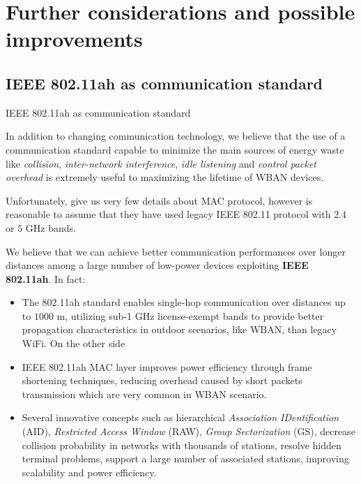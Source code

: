 \documentclass[10pt]{beamer}
\begin{document}
\section{Further considerations and possible improvements}
\subsection{IEEE 802.11ah as communication standard}
\begin{frame}{IEEE 802.11ah as communication standard}

In addition to changing communication technology, we believe that the use of a communication standard capable to minimize the main sources of energy waste like \textit{collision}, \textit{inter-network interference}, \textit{idle listening} and \textit{control packet overhead} is extremely useful to maximizing the lifetime of WBAN devices.

Unfortunately, \citet{MSAReport} give us very few details about MAC protocol, however is reasonable to assume that they have used legacy IEEE 802.11 protocol with $2.4$ or $5$ GHz bands.

We believe that we can achieve better communication performances over longer distances among a large number of low-power devices exploiting \textbf{IEEE 802.11ah}. In fact:

\begin{itemize}
\item The 802.11ah standard enables single-hop communication over distances up to $1000$ m, utilizing sub-1 GHz license-exempt bands to provide better propagation characteristics in outdoor scenarios, like WBAN, than legacy WiFi. On the other side

\item IEEE 802.11ah MAC layer improves power efficiency through frame shortening techniques, reducing overhead caused by short packets transmission which are very common in WBAN scenario.

\item Several innovative concepts such as hierarchical \textit{Association IDentification} (AID), \textit{Restricted Access Window} (RAW), \textit{Group Sectorization} (GS), decrease collision probability in networks with thousands of stations, resolve hidden terminal problems, support a large number of associated stations, improving scalability and power efficiency.


\end{itemize}
\end{frame}
\end{document}
